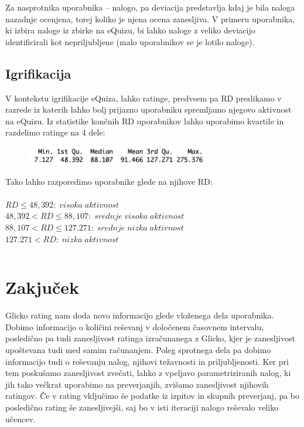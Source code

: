 \documentclass{IEEEtran}
\makeatletter
\let\old@subsection\subsection
\renewcommand{\subsection}[1]{\bigskip\old@subsection{#1}\@afterindentfalse\@afterheading}
\makeatother
\begin{document}
Za nasprotnika uporabnika – nalogo, pa deviacija predstavlja kdaj je bila naloga nazadnje ocenjena, torej koliko je njena ocena zanesljiva. V primeru uporabnika, ki izbira naloge iz zbirke na eQuizu, bi lahko naloge z veliko deviacijo identificirali kot nepriljubljene (malo uporabnikov se je lotilo naloge).


\subsection{Igrifikacija}
V kontekstu igrifikacije eQuiza, lahko ratinge, predvsem pa $\mathrm{RD}$ preslikamo v razrede iz katerih lahko bolj prijazno uporabniku spremljamo njegovo aktivnost na eQuizu. Iz statistike končnih $\mathrm{RD}$ uporabnikov lahko uporabimo kvartile in razdelimo ratinge na 4 dele:

\begin{figure}[h!]
    \includegraphics[width=8cm]{RDstat}
    \label{fig:example}%
\end{figure}

Tako lahko razporedimo uporabnike glede na njihove $\mathrm{RD}$:
\hfill
\\
\\
$RD\leq48,392:\;visoka\;aktivnost$
\hfill
\\
$48,392<RD\leq88,107:\;srednje\;visoka\;aktivnost$
\hfill
\\
$88,107<RD\leq127.271:\;srednje\;nizka\;aktivnost$
\hfill
\\
$127.271<RD:\;nizka\;aktivnost$
\hfill




\lstset{basicstyle=\tiny,style=SQLstyle}
\begin{lstlisting}
\end{lstlisting}
\newpage
\section{Zakjuček}
\label{sec:cnc}

Glicko rating nam doda novo informacijo glede vloženega dela uporabnika. Dobimo informacijo o količini reševanj v določenem časovnem intervalu, posledično pa tudi zanesljivost ratinga izračunanega z Glicko, kjer je zanesljivost upoštevana tudi med samim računanjem. Poleg sprotnega dela pa dobimo informacijo tudi o reševanju nalog, njihovi težavnosti in priljubljenosti. Ker pri tem poskušamo zanesljivost zvečati, lahko z vpeljavo parametriziranih nalog, ki jih tako večkrat uporabimo na preverjanjih, zvišamo zanesljivost njihovih ratingov. Če v rating vključimo še podatke iz izpitov in skupnih preverjanj, pa bo posledično rating še zanesljivejši, saj bo v isti iteraciji nalogo reševalo veliko učencev.
\end{document}
